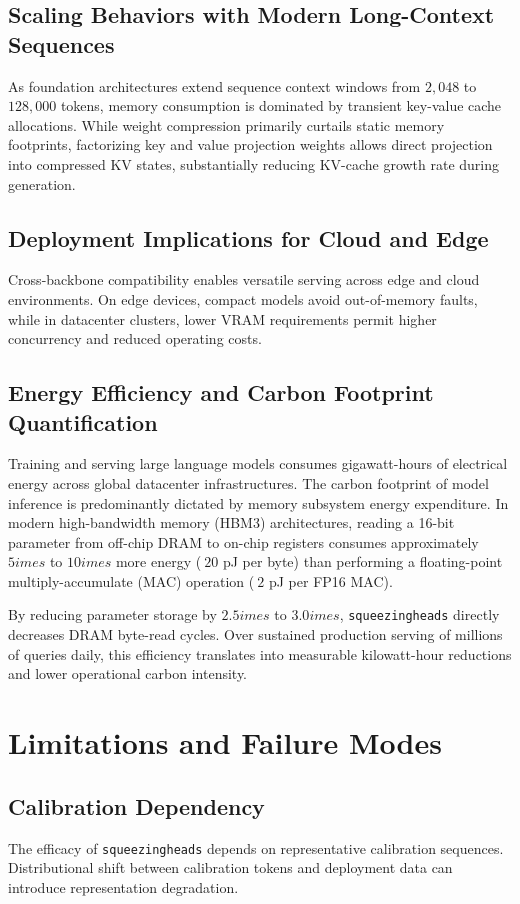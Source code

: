 \subsection{Scaling Behaviors with Modern Long-Context Sequences}
As foundation architectures extend sequence context windows from $2{,}048$ to $128{,}000$ tokens, memory consumption is dominated by transient key-value cache allocations. While weight compression primarily curtails static memory footprints, factorizing key and value projection weights allows direct projection into compressed KV states, substantially reducing KV-cache growth rate during generation.

\subsection{Deployment Implications for Cloud and Edge}
Cross-backbone compatibility enables versatile serving across edge and cloud environments. On edge devices, compact models avoid out-of-memory faults, while in datacenter clusters, lower VRAM requirements permit higher concurrency and reduced operating costs.

\subsection{Energy Efficiency and Carbon Footprint Quantification}
Training and serving large language models consumes gigawatt-hours of electrical energy across global datacenter infrastructures. The carbon footprint of model inference is predominantly dictated by memory subsystem energy expenditure. In modern high-bandwidth memory (HBM3) architectures, reading a 16-bit parameter from off-chip DRAM to on-chip registers consumes approximately $5	imes$ to $10	imes$ more energy ($~20$ pJ per byte) than performing a floating-point multiply-accumulate (MAC) operation ($~2$ pJ per FP16 MAC).

By reducing parameter storage by $2.5	imes$ to $3.0	imes$, \texttt{squeezingheads} directly decreases DRAM byte-read cycles. Over sustained production serving of millions of queries daily, this efficiency translates into measurable kilowatt-hour reductions and lower operational carbon intensity.


\section{Limitations and Failure Modes}

\subsection{Calibration Dependency}
The efficacy of \texttt{squeezingheads} depends on representative calibration sequences. Distributional shift between calibration tokens and deployment data can introduce representation degradation.

